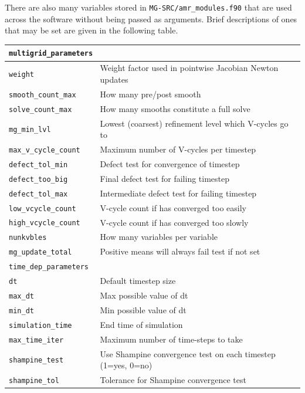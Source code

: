 \documentclass[paper=a4, fontsize=11pt,twoside,bibtotoc]{scrartcl}		%
\begin{document}
There are also many variables stored in \texttt{MG-SRC/amr\_modules.f90} that are used across the software without being passed as arguments.
Brief descriptions of ones that may be set are given in the following table.

\begin{center}
	\begin{longtable}{|lc|p{}|}
		\hline
		\multicolumn{3}{|l|}{\texttt{multigrid\_parameters}}\\
		\hline
		\texttt{weight }& & Weight factor used in pointwise Jacobian Newton updates\\
		
		\texttt{smooth\_count\_max }& & How many pre/post smooth\\
		\texttt{solve\_count\_max	}& & How many smooths constitute a full solve\\
		\texttt{mg\_min\_lvl }& & Lowest (coarsest) refinement level which V-cycles go to\\
		\texttt{max\_v\_cycle\_count}& & Maximum number of V-cycles per timestep\\
  		\texttt{defect\_tol\_min  }& &Defect test for convergence of timestep \\
  		\texttt{defect\_too\_big }& &Final defect test for failing timestep\\
  		\texttt{defect\_tol\_max  }& &Intermediate defect test for failing timestep\\
  		\texttt{low\_vcycle\_count             }& &V-cycle count if has converged too easily\\
  		\texttt{high\_vcycle\_count            }& &V-cycle count if has converged too slowly\\

		\texttt{nunkvbles }& &   How many variables per variable\\
		\texttt{mg\_update\_total }& &Positive means will always fail test if not set\\
		\hline
		\multicolumn{3}{|l|}{\texttt{time\_dep\_parameters}}\\
		\hline
		\texttt{dt	}& & Default timestep size\\
		\texttt{max\_dt}& &  Max possible value of dt\\
		\texttt{min\_dt}& &  Min possible value of dt\\
		\texttt{simulation\_time }& &End time of simulation\\
		\texttt{max\_time\_iter}& &Maximum number of time-steps to take\\
		\texttt{shampine\_test}& &Use Shampine convergence test on each timestep (1=yes, 0=no)\\
		\texttt{shampine\_tol }& &Tolerance for Shampine convergence test\\


\end{longtable}
\end{center}
\end{document}
